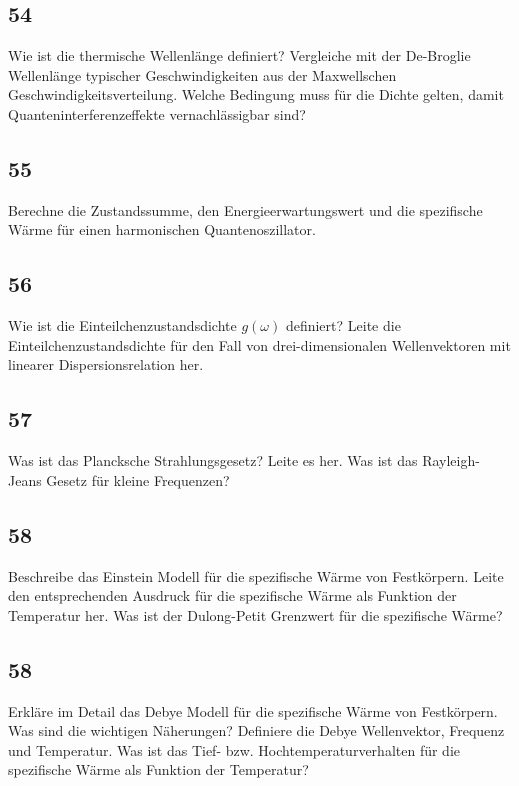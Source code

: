 \documentclass[12pt,a4paper]{report}
\newenvironment{myfrag}{\begin{it}}{\end{it}\vspace{3mm}\par}
\numberwithin{equation}{section}
\begin{document}
\subsection{54}
\begin{myfrag}
Wie ist die thermische Wellenlänge definiert? Vergleiche mit der De-Broglie
Wellenlänge typischer Geschwindigkeiten aus der Maxwellschen
Geschwindigkeitsverteilung. Welche Bedingung muss für die Dichte gelten,
damit Quanteninterferenzeffekte vernachlässigbar sind?
\end{myfrag}
\subsection{55}
\begin{myfrag}
Berechne die Zustandssumme, den Energieerwartungswert und die
spezifische Wärme für einen harmonischen Quantenoszillator.
\end{myfrag}
\subsection{56}
\begin{myfrag}
Wie ist die Einteilchenzustandsdichte $g(\omega )$ definiert? Leite die
Einteilchenzustandsdichte für den Fall von drei-dimensionalen
Wellenvektoren mit linearer Dispersionsrelation her.
\end{myfrag}
\subsection{57}
\begin{myfrag}
Was ist das Plancksche Strahlungsgesetz? Leite es her. Was ist das
Rayleigh-Jeans Gesetz für kleine Frequenzen?
\end{myfrag}
\subsection{58}
\begin{myfrag}
Beschreibe das Einstein Modell für die spezifische Wärme von Festkörpern.
Leite den entsprechenden Ausdruck für die spezifische Wärme als Funktion
der Temperatur her. Was ist der Dulong-Petit Grenzwert für die spezifische
Wärme?
\end{myfrag}
\subsection{58}
\begin{myfrag}
Erkläre im Detail das Debye Modell für die spezifische Wärme von
Festkörpern. Was sind die wichtigen Näherungen? Definiere die Debye
Wellenvektor, Frequenz und Temperatur. Was ist das Tief- bzw.
Hochtemperaturverhalten für die spezifische Wärme als Funktion der
Temperatur?
\end{myfrag}
\end{document}
